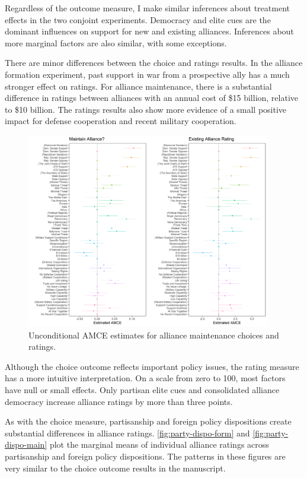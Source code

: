 \documentclass[12pt]{article}
\begin{document}
Regardless of the outcome measure, I make similar inferences about treatment effects in the two conjoint experiments. 
Democracy and elite cues are the dominant influences on support for new and existing alliances. 
Inferences about more marginal factors are also similar, with some exceptions. 


There are minor differences between the choice and ratings results. 
In the alliance formation experiment, past support in war from a prospective ally has a much stronger effect on ratings. 
For alliance maintenance, there is a substantial difference in ratings between alliances with an annual cost of \$15 billion, relative to \$10 billion. 
The ratings results also show more evidence of a small positive impact for defense cooperation and recent military cooperation. 



\begin{figure}
	\centering
		\includegraphics[width=0.95\textwidth]{maintenance-plots.png}
	\caption{Unconditional AMCE estimates for alliance maintenance choices and ratings.}
	\label{fig:maintenance-plots}
\end{figure}


Although the choice outcome reflects important policy issues, the rating measure has a more intuitive interpretation. 
On a scale from zero to 100, most factors have null or small effects. 
Only partisan elite cues and consolidated alliance democracy increase alliance ratings by more than three points. 


As with the choice measure, partisanship and foreign policy dispositions create substantial differences in alliance ratings.
\autoref{fig:party-dispo-form} and \autoref{fig:party-dispo-main} plot the marginal means of individual alliance ratings across partisanship and foreign policy dispositions. 
The patterns in these figures are very similar to the choice outcome results in the manuscript.  
\end{document}
